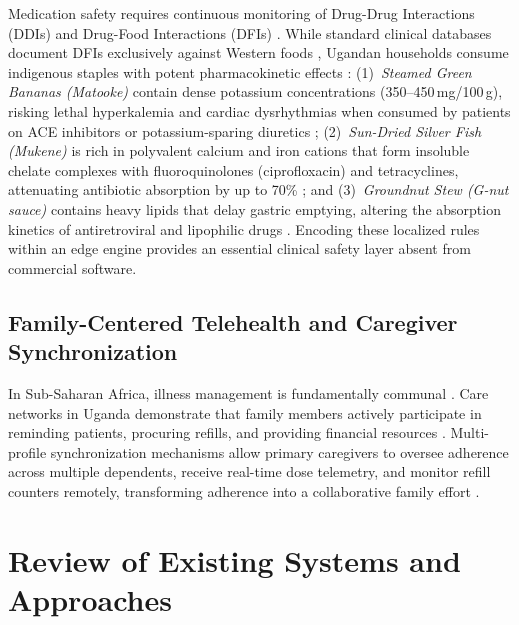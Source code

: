 Medication safety requires continuous monitoring of Drug-Drug Interactions (DDIs) and Drug-Food Interactions (DFIs) \cite{who2017medication, bushra2011food}. While standard clinical databases document DFIs exclusively against Western foods \cite{bailey2013grapefruit}, Ugandan households consume indigenous staples with potent pharmacokinetic effects \cite{fao2019food}: (1)~\textit{Steamed Green Bananas (Matooke)} contain dense potassium concentrations (350--450\,mg/100\,g), risking lethal hyperkalemia and cardiac dysrhythmias when consumed by patients on ACE inhibitors or potassium-sparing diuretics \cite{bushra2011food}; (2)~\textit{Sun-Dried Silver Fish (Mukene)} is rich in polyvalent calcium and iron cations that form insoluble chelate complexes with fluoroquinolones (ciprofloxacin) and tetracyclines, attenuating antibiotic absorption by up to 70\% \cite{bushra2011food}; and (3)~\textit{Groundnut Stew (G-nut sauce)} contains heavy lipids that delay gastric emptying, altering the absorption kinetics of antiretroviral and lipophilic drugs \cite{bushra2011food}. Encoding these localized rules within an edge engine provides an essential clinical safety layer absent from commercial software.

\subsection{Family-Centered Telehealth and Caregiver Synchronization}

In Sub-Saharan Africa, illness management is fundamentally communal \cite{ware2009social}. Care networks in Uganda demonstrate that family members actively participate in reminding patients, procuring refills, and providing financial resources \cite{ware2009social, haberer2013realtime}. Multi-profile synchronization mechanisms allow primary caregivers to oversee adherence across multiple dependents, receive real-time dose telemetry, and monitor refill counters remotely, transforming adherence into a collaborative family effort \cite{ware2009social}.

\section{Review of Existing Systems and Approaches}

